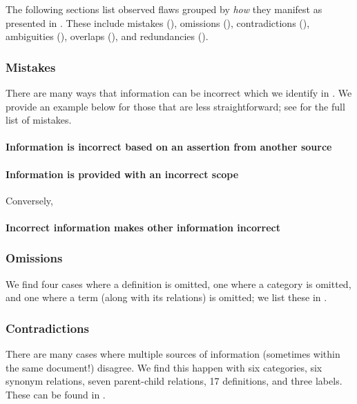 The following sections list observed flaws grouped by \emph{how} they manifest
as presented in . These include mistakes (),
omissions (), contradictions (), ambiguities
(), overlaps (), and redundancies ().

\subsubsection{Mistakes}\label{wrong}

There are many ways that information can be incorrect which we identify in
. We provide an example below for those that are less
straightforward\ifnotpaper; see  for the full list of
mistakes\fi.



\paragraph{Information is incorrect based on an assertion from another source}
\errorGuessFlaw{}

\paragraph{Information is provided with an incorrect scope}
\parSheetTestFlaw{} Conversely, \tolTestFlaw*{}

\paragraph{Incorrect information makes other information incorrect}
\redBoxFlaw{}

\subsubsection{Omissions}\label{miss}
We find four cases where a definition is omitted, one where a category is
omitted, and one where a term (along with its relations) is omitted\ifnotpaper;
we list these in \fi.

\subsubsection{Contradictions}\label{contra}
There are many cases where multiple sources of information (sometimes within
the same document!) disagree. We find this happen with six categories, six
synonym relations, seven parent-child relations, 17 definitions, and three
labels. \ifnotpaper These can be found in .\fi

